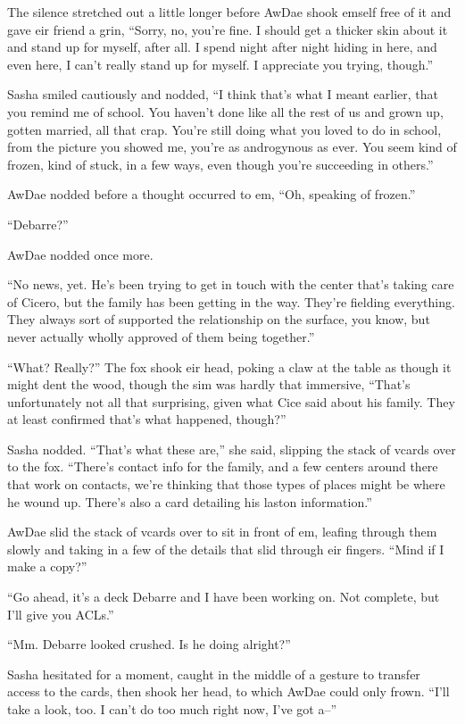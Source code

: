 The silence stretched out a little longer before AwDae shook emself free of it and gave eir friend a grin, ``Sorry, no, you're fine. I should get a thicker skin about it and stand up for myself, after all. I spend night after night hiding in here, and even here, I can't really stand up for myself. I appreciate you trying, though.''

Sasha smiled cautiously and nodded, ``I think that's what I meant earlier, that you remind me of school. You haven't done like all the rest of us and grown up, gotten married, all that crap. You're still doing what you loved to do in school, from the picture you showed me, you're as androgynous as ever. You seem kind of frozen, kind of stuck, in a few ways, even though you're succeeding in others.''

AwDae nodded before a thought occurred to em, ``Oh, speaking of frozen.''

``Debarre?''

AwDae nodded once more.

``No news, yet. He's been trying to get in touch with the center that's taking care of Cicero, but the family has been getting in the way. They're fielding everything. They always sort of supported the relationship on the surface, you know, but never actually wholly approved of them being together.''

``What? Really?'' The fox shook eir head, poking a claw at the table as though it might dent the wood, though the sim was hardly that immersive, ``That's unfortunately not all that surprising, given what Cice said about his family. They at least confirmed that's what happened, though?''

Sasha nodded. ``That's what these are,'' she said, slipping the stack of vcards over to the fox. ``There's contact info for the family, and a few centers around there that work on contacts, we're thinking that those types of places might be where he wound up. There's also a card detailing his laston information.''

AwDae slid the stack of vcards over to sit in front of em, leafing through them slowly and taking in a few of the details that slid through eir fingers. ``Mind if I make a copy?''

``Go ahead, it's a deck Debarre and I have been working on. Not complete, but I'll give you ACLs.''

``Mm. Debarre looked crushed. Is he doing alright?''

Sasha hesitated for a moment, caught in the middle of a gesture to transfer access to the cards, then shook her head, to which AwDae could only frown. ``I'll take a look, too. I can't do too much right now, I've got a--''

